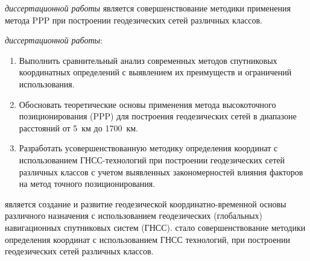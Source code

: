 
 
{\aim} \textit{диссертационной работы} является совершенствование методики применения метода PPP при построении геодезических сетей различных классов.

{\tasks} \textit{диссертационной работы}:
\begin{enumerate}[beginpenalty=10000] %
	\item Выполнить сравнительный анализ современных методов спутниковых координатных определений с выявлением их преимуществ и
	ограничений использования.
	\item Обосновать теоретические основы применения метода высокоточного позиционирования (PPP) для построения геодезических сетей в диапазоне расстояний от 5~км до 1700~км.
	\item Разработать усовершенствованную методику определения координат с использованием ГНСС-технологий при построении геодезических сетей различных классов с учетом выявленных закономерностей влияния факторов на метод точного позиционирования.
\end{enumerate}

{\researchobj} является создание и развитие геодезической координатно-временной основы различного назначения с использованием геодезических (глобальных) навигационных спутниковых систем (ГНСС).
{\researchsubj} стало совершенствование методики определения координат с использованием ГНСС технологий, при построении геодезических сетей различных классов.

